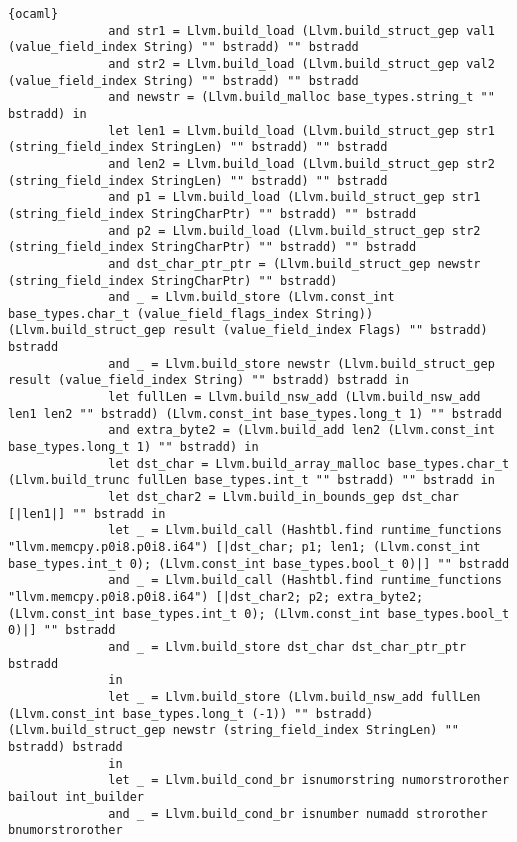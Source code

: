 \begin{lstlisting}{ocaml}
              and str1 = Llvm.build_load (Llvm.build_struct_gep val1 (value_field_index String) "" bstradd) "" bstradd
              and str2 = Llvm.build_load (Llvm.build_struct_gep val2 (value_field_index String) "" bstradd) "" bstradd
              and newstr = (Llvm.build_malloc base_types.string_t "" bstradd) in
              let len1 = Llvm.build_load (Llvm.build_struct_gep str1 (string_field_index StringLen) "" bstradd) "" bstradd
              and len2 = Llvm.build_load (Llvm.build_struct_gep str2 (string_field_index StringLen) "" bstradd) "" bstradd
              and p1 = Llvm.build_load (Llvm.build_struct_gep str1 (string_field_index StringCharPtr) "" bstradd) "" bstradd
              and p2 = Llvm.build_load (Llvm.build_struct_gep str2 (string_field_index StringCharPtr) "" bstradd) "" bstradd
              and dst_char_ptr_ptr = (Llvm.build_struct_gep newstr (string_field_index StringCharPtr) "" bstradd)
              and _ = Llvm.build_store (Llvm.const_int base_types.char_t (value_field_flags_index String)) (Llvm.build_struct_gep result (value_field_index Flags) "" bstradd) bstradd
              and _ = Llvm.build_store newstr (Llvm.build_struct_gep result (value_field_index String) "" bstradd) bstradd in
              let fullLen = Llvm.build_nsw_add (Llvm.build_nsw_add len1 len2 "" bstradd) (Llvm.const_int base_types.long_t 1) "" bstradd
              and extra_byte2 = (Llvm.build_add len2 (Llvm.const_int base_types.long_t 1) "" bstradd) in
              let dst_char = Llvm.build_array_malloc base_types.char_t (Llvm.build_trunc fullLen base_types.int_t "" bstradd) "" bstradd in
              let dst_char2 = Llvm.build_in_bounds_gep dst_char [|len1|] "" bstradd in
              let _ = Llvm.build_call (Hashtbl.find runtime_functions "llvm.memcpy.p0i8.p0i8.i64") [|dst_char; p1; len1; (Llvm.const_int base_types.int_t 0); (Llvm.const_int base_types.bool_t 0)|] "" bstradd
              and _ = Llvm.build_call (Hashtbl.find runtime_functions "llvm.memcpy.p0i8.p0i8.i64") [|dst_char2; p2; extra_byte2; (Llvm.const_int base_types.int_t 0); (Llvm.const_int base_types.bool_t 0)|] "" bstradd
              and _ = Llvm.build_store dst_char dst_char_ptr_ptr bstradd
              in
              let _ = Llvm.build_store (Llvm.build_nsw_add fullLen (Llvm.const_int base_types.long_t (-1)) "" bstradd) (Llvm.build_struct_gep newstr (string_field_index StringLen) "" bstradd) bstradd
              in
              let _ = Llvm.build_cond_br isnumorstring numorstrorother bailout int_builder
              and _ = Llvm.build_cond_br isnumber numadd strorother bnumorstrorother

\end{lstlisting}
